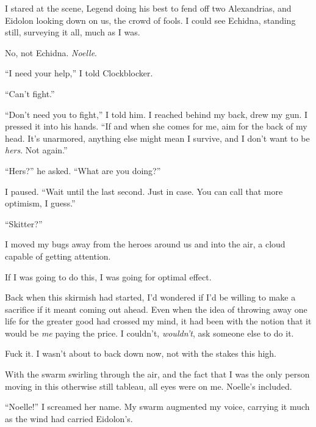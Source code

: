 I stared at the scene, Legend doing his best to fend off two Alexandrias, and Eidolon looking down on us, the crowd of fools.  I could see Echidna, standing still, surveying it all, much as I was.



No, not Echidna.  \emph{Noelle}.



``I need your help,'' I told Clockblocker.



``Can't fight.''



``Don't need you to fight,'' I told him.  I reached behind my back, drew my gun.  I pressed it into his hands.  ``If and when she comes for me, aim for the back of my head.  It's unarmored, anything else might mean I survive, and I don't want to be \emph{hers}.  Not again.''



``Hers?'' he asked.  ``What are you doing?''



I paused.  ``Wait until the last second.  Just in case.  You can call that more optimism, I guess.''



``Skitter?''



I moved my bugs away from the heroes around us and into the air, a cloud capable of getting attention.



If I was going to do this, I was going for optimal effect.



Back when this skirmish had started, I'd wondered if I'd be willing to make a sacrifice if it meant coming out ahead.  Even when the idea of throwing away one life for the greater good had crossed my mind, it had been with the notion that it would be \emph{me} paying the price.  I couldn't, \emph{wouldn't}, ask someone else to do it.



Fuck it.  I wasn't about to back down now, not with the stakes this high.



With the swarm swirling through the air, and the fact that I was the only person moving in this otherwise still tableau, all eyes were on me.  Noelle's included.



``Noelle!'' I screamed her name.  My swarm augmented my voice, carrying it much as the wind had carried Eidolon's.



